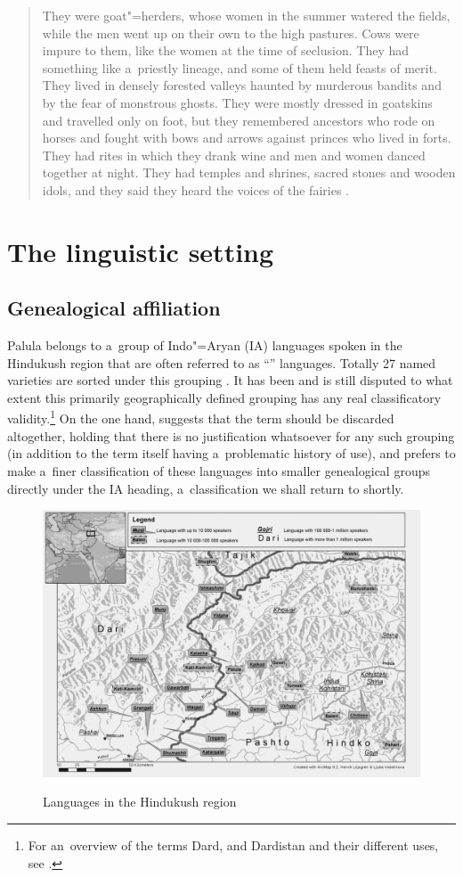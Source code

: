 \begin{quote}
They were goat"=herders, whose women in the summer watered the fields, while the men went up on their
own to the high pastures. Cows were impure to them, like the women at the time of seclusion. They
had something like a~priestly lineage, and some of them held feasts of merit. They lived in densely
forested valleys haunted by murderous bandits and by the fear of monstrous ghosts. They were mostly
dressed in goatskins and travelled only on foot, but they remembered ancestors who rode on horses
and fought with bows and arrows against princes who lived in forts. They had rites in which they
drank wine and men and women danced together at night. They had temples and shrines, sacred stones
and wooden idols, and they said they heard the voices of the fairies \citep[143]{cacopardo2001}.
\end{quote}

\section{The linguistic setting}
\label{sec:1-3}
\subsection{Genealogical affiliation}
\label{subsec:1-3-1}
Palula belongs to a~group of Indo"=Aryan (IA) languages spoken in the Hindukush region that are often referred to as ``\iliDardic'' languages. Totally 27 named varieties are sorted under this grouping \citep{ethnologue2015}. It has been and is still disputed to what extent this primarily geographically defined grouping has any real classificatory validity.\footnote{For an~overview of the terms Dard, \iliDardic and Dardistan and their different uses, see \citealt{mock1997}.} On the one hand, \citet[251]{strand2001} suggests that the term should be discarded altogether, holding that there is no justification whatsoever for any such grouping (in addition to the term itself having a~problematic history of use), and prefers to make a~finer classification of these languages into smaller genealogical groups directly under the IA heading, a~classification we shall return to shortly. 

\begin{figure}
\caption{Languages in the Hindukush region}
\includegraphics[width=.8\textwidth]{figures/ch1map2.pdf}
\label{map:1-2}
\end{figure}

